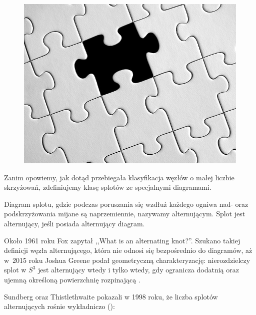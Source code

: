 {\begin{figure}[H]
\begin{minipage}[b]{.32\linewidth}
        \includegraphics[width=\linewidth]{../data/missing.jpg}
    \end{minipage}
\end{figure}

Zanim opowiemy, jak dotąd przebiegała klasyfikacja węzłów o małej liczbie skrzyżowań, zdefiniujemy klasę splotów ze specjalnymi diagramami.

\begin{definition}[alternacja]
    Diagram splotu, gdzie podczas poruszania się wzdłuż każdego ogniwa nad- oraz podskrzyżowania mijane są naprzemiennie, nazywamy alternującym.
    Splot jest alternujący, jeśli posiada alternujący diagram.
\end{definition}

Około 1961 roku Fox zapytał ,,What is an alternating knot?''.
Szukano takiej definicji węzła alternującego, która nie odnosi się bezpośrednio do diagramów, aż w~2015 roku Joshua Greene podał geometryczną charakteryzację: nierozdzielczy splot w $S^3$ jest alternujący wtedy i tylko wtedy, gdy ogranicza dodatnią oraz ujemną określoną powierzchnię rozpinającą \cite{greene17}.

Sundberg oraz Thistlethwaite pokazali w 1998 roku, że liczba splotów alternujących rośnie wykładniczo (\cite{sundberg98}):

}
